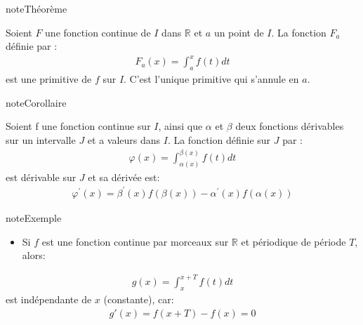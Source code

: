 \documentclass[letterpaper,10pt,french]{sphinxmanual}
\begin{document}
\begin{sphinxadmonition}{note}{Théorème}

\sphinxAtStartPar
Soient \(F\) une fonction continue de \(I\) dans \(\mathbb{R}\) et \(a\) un point de \(I\). La fonction \(F_a\) définie par :
\begin{equation*}
\begin{split}
F_a(x) = \int_a^x f(t) dt
\end{split}
\end{equation*}
\sphinxAtStartPar
est une primitive de \(f\) sur \(I\). C’est l’unique primitive qui s’annule en \(a\).
\end{sphinxadmonition}

\begin{sphinxadmonition}{note}{Corollaire}

\sphinxAtStartPar
Soient f une fonction continue sur \(I\), ainsi que \(\alpha\) et \(\beta\) deux fonctions dérivables sur un intervalle \(J\) et a valeurs dans \(I\). La fonction définie sur \(J\) par :
\begin{equation*}
\begin{split}
\varphi(x) = \int_{\alpha(x)}^{\beta(x)} f(t) dt
\end{split}
\end{equation*}
\sphinxAtStartPar
est dérivable sur \(J\) et sa dérivée est:
\begin{equation*}
\begin{split}
\varphi^{'}(x) = \beta^{'}(x)f(\beta(x))- \alpha^{'}(x)f(\alpha(x))
\end{split}
\end{equation*}\end{sphinxadmonition}

\begin{sphinxadmonition}{note}{Exemple}
\begin{itemize}
\item {} 
\sphinxAtStartPar
Si \(f\) est une fonction continue par morceaux sur \(\mathbb{R}\) et périodique de période \(T\), alors:

\end{itemize}
\begin{equation*}
\begin{split}
g(x) = \int_x^{x+T}f(t)dt
\end{split}
\end{equation*}
\sphinxAtStartPar
est indépendante de \(x\) (constante), car:
\begin{equation*}
\begin{split}
g'(x) = f(x+T) - f(x) = 0
\end{split}
\end{equation*}\end{sphinxadmonition}
\end{document}
